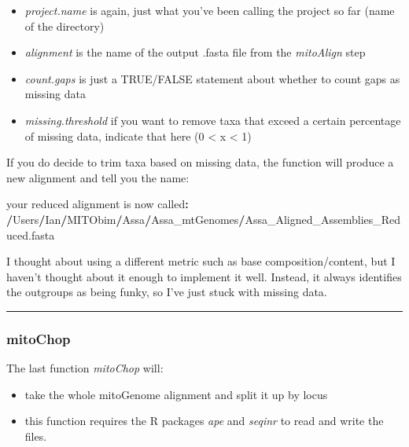 \documentclass[
]{article}
\newenvironment{Shaded}{\begin{snugshade}}{\end{snugshade}}
\newcommand{\ErrorTok}[1]{\textcolor[rgb]{0.64,0.00,0.00}{\textbf{#1}}}
\newcommand{\NormalTok}[1]{#1}
\newcommand{\OperatorTok}[1]{\textcolor[rgb]{0.81,0.36,0.00}{\textbf{#1}}}
\providecommand{\tightlist}{%
  \setlength{\itemsep}{0pt}\setlength{\parskip}{0pt}}
\begin{document}
\begin{itemize}
\tightlist
\item
  \emph{project.name} is again, just what you've been calling the
  project so far (name of the directory)\\
\item
  \emph{alignment} is the name of the output .fasta file from the
  \emph{mitoAlign} step\\
\item
  \emph{count.gaps} is just a TRUE/FALSE statement about whether to
  count gaps as missing data\\
\item
  \emph{missing.threshold} if you want to remove taxa that exceed a
  certain percentage of missing data, indicate that here (0 \textless{}
  x \textless{} 1)
\end{itemize}

If you do decide to trim taxa based on missing data, the function will
produce a new alignment and tell you the name:

\begin{Shaded}
\begin{Highlighting}[]
\NormalTok{your reduced alignment is now called}\OperatorTok{:}
\ErrorTok{/}\NormalTok{Users}\OperatorTok{/}\NormalTok{Ian}\OperatorTok{/}\NormalTok{MITObim}\OperatorTok{/}\NormalTok{Assa}\OperatorTok{/}\NormalTok{Assa_mtGenomes}\OperatorTok{/}\NormalTok{Assa_Aligned_Assemblies_Reduced.fasta}
\end{Highlighting}
\end{Shaded}

I thought about using a different metric such as base
composition/content, but I haven't thought about it enough to implement
it well. Instead, it always identifies the outgroups as being funky, so
I've just stuck with missing data.

\begin{center}\rule{0.5\linewidth}{0.5pt}\end{center}

\hypertarget{mitochop}{%
\subsubsection{mitoChop}\label{mitochop}}

The last function \emph{mitoChop} will:

\begin{itemize}
\tightlist
\item
  take the whole mitoGenome alignment and split it up by locus\\
\item
  this function requires the R packages \emph{ape} and \emph{seqinr} to
  read and write the files.
\end{itemize}
\end{document}
